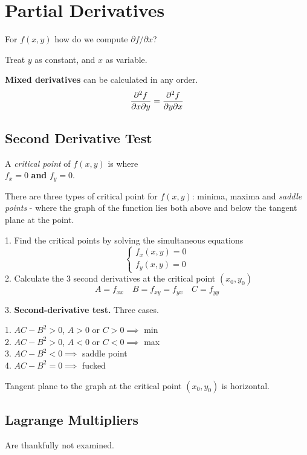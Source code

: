 \section{Partial Derivatives}

For $f(x,y)$ how do we compute $\partial f / \partial x$?

Treat $y$ as constant, and $x$ as variable.

\textbf{Mixed derivatives} can be calculated in any order.
\begin{equation*}
    \pdv{f}{x}{y} = \pdv{f}{y}{x}
\end{equation*}

\subsection*{Second Derivative Test}

A \textit{critical point} of $f(x,y)$ is where \\
$f_x = 0$ \textbf{and} $f_y = 0$.

There are three types of critical point for $f(x,y)$: minima, maxima and \textit{saddle points} - where the graph
of the function lies both above and below the tangent plane at the point.
\vspace{\baselineskip}

1. Find the critical points by solving the simultaneous equations
\begin{equation*}
\begin{cases}
    f_x(x,y) = 0 \\
    f_y(x,y) = 0
\end{cases}
\end{equation*}
2. Calculate the 3 second derivatives at the critical point $(x_0, y_0)$
\begin{equation*}
    A = f_{xx} \quad B = f_{xy} = f_{yx} \quad C = f_{yy}
\end{equation*}

3. \textbf{Second-derivative test.} Three cases.

1. $AC - B^2 > 0$, $A > 0$ or $C > 0 \implies$ min \\
2. $AC - B^2 > 0$, $A < 0$ or $C < 0 \implies$ max \\
3. $AC - B^2 < 0 \implies$ saddle point \\
4. $AC - B^2 = 0 \implies$ fucked

Tangent plane to the graph at the critical point $(x_0, y_0)$ is horizontal.

\subsection*{Lagrange Multipliers}
Are thankfully not examined.
